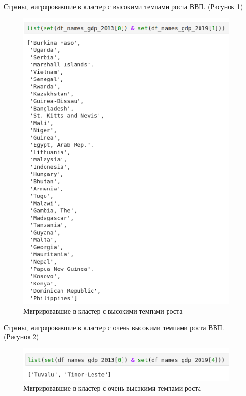 \documentclass[14pt,fleqn]{extarticle}
\begin{document}
	Страны, мигрировавшие в кластер с высокими темпами роста ВВП. (Рисунок \ref{fig:cluster_mean_high})

	\begin{figure}[h]
		\centering \includegraphics[scale=0.45]{cluster_mean_high}
		\caption{Мигрировавшие в кластер с высокими темпами роста}
		\label{fig:cluster_mean_high}
	\end{figure}

	Страны, мигрировавшие в кластер с очень высокими темпами роста ВВП. (Рисунок \ref{fig:cluster_mean_very_high})

	\begin{figure}[h]
		\centering \includegraphics[scale=0.5]{cluster_mean_very_high}
		\caption{Мигрировавшие в кластер с очень высокими темпами роста}
		\label{fig:cluster_mean_very_high}
	\end{figure}
\end{document}
